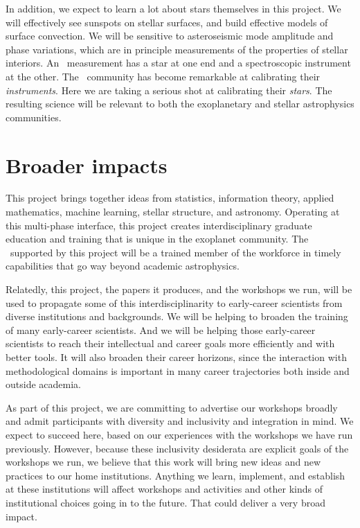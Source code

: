 \documentclass[12pt, letterpaper]{article}
\begin{document}
In addition, we expect to learn a lot about stars themselves in this project.
We will effectively see sunspots on stellar surfaces, and build effective models
of surface convection.
We will be sensitive to asteroseismic mode amplitude and phase variations, which
are in principle measurements of the properties of stellar interiors.
An \EPRV\ measurement has a star at one end and a spectroscopic instrument at the other.
The \EPRV\ community has become remarkable at calibrating their \emph{instruments}.
Here we are taking a serious shot at calibrating their \emph{stars}. 
The resulting science will be relevant to both the exoplanetary and stellar astrophysics 
communities.

\section{Broader impacts}

This project brings together ideas from statistics, information theory, applied mathematics, machine learning, stellar structure, and astronomy.
Operating at this multi-phase interface, this project creates interdisciplinary graduate education and training that is unique in the exoplanet community.
The \GRA\ supported by this project will be a trained member of the  workforce in timely capabilities that go way beyond academic astrophysics.

Relatedly, this project, the papers it produces, and the workshops we run, will be used to propagate some of this interdisciplinarity to early-career scientists from diverse institutions and backgrounds.
We will be helping to broaden the training of many early-career scientists.
And we will be helping those early-career scientists to reach their intellectual and career goals more efficiently and with better tools.
It will also broaden their career horizons, since the interaction with methodological domains is important in many career trajectories both inside and outside academia.

As part of this project, we are committing to advertise our workshops broadly and admit participants with diversity and inclusivity and integration in mind. 
We expect to succeed here, based on our experiences with the workshops we have run previously.
However, because these inclusivity desiderata are explicit goals of the workshops we run, we believe that this work will bring new ideas and new practices to our home institutions.
Anything we learn, implement, and establish at these institutions will affect workshops and activities and other kinds of institutional choices going in to the future.
That could deliver a very broad impact.
\end{document}
